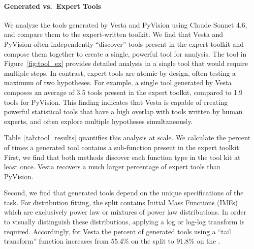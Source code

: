 \documentclass{article}
\newcommand{\method}{{\sc Vesta}}
\newcommand{\splitlabel}[3]{%
  \tikz[baseline=-0.6ex]{%
    \node[
      rounded corners=3pt,
      fill=#2,
      draw=#1,
      line width=0.8pt,
      inner xsep=4pt,
      inner ysep=2pt,
      font=\bfseries\small
    ] {#3};%
  }%
}
\newcommand{\Easy}{\splitlabel{easygreen}{easyfill}{Easy}}
\newcommand{\Astro}{\splitlabel{astroblue}{astrofill}{Astro}}
\begin{document}
\vspace{-0.3em}
\paragraph{Generated vs.\ Expert Tools}
We analyze the tools generated by \method{} and PyVision using Claude Sonnet 4.6,
and compare them to the expert-written toolkit. 
We find that \method{} and PyVision often independently ``discover'' tools present in the expert toolkit and compose them together to create a single, powerful tool for analysis. The tool in Figure~\ref{fig:tool_ex} provides detailed analysis in a single tool that would require multiple steps.
In contrast, expert tools are atomic by design, often testing a maximum of two hypotheses. 
For example, a single tool generated by \method{} composes an average of 3.5 tools present in the expert toolkit, compared to 1.9 tools for PyVision. This finding indicates that \method{} is capable of creating powerful statistical tools that have a high overlap with tools written by human experts, and often explore multiple hypotheses simultaneously. 

Table~\ref{tab:tool_results} quantifies this analysis at scale. We calculate the percent of times a generated tool contains a sub-function present in the expert toolkit. First, we find that both methods discover each function type in the tool kit at least once. \method{} recovers a much larger percentage of expert tools than PyVision.

Second, we find that generated tools depend on the unique specifications of the task. For distribution fitting, the \protect\Astro{} split contains Initial Mass Functions (IMFs) which are exclusively power law or mixtures of power law distributions. In order to visually distinguish these distributions, applying a log or log-log transform is required. Accordingly, for \method{} the percent of generated tools using a ``tail transform'' function increases from 55.4\% on the \protect\Easy{} split to 91.8\% on the \protect\Astro{}. 
\end{document}
